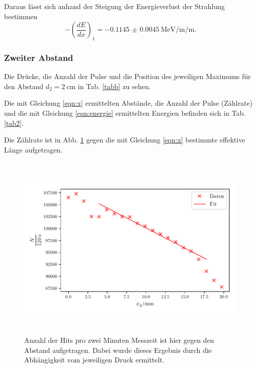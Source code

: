 \noindent Daraus lässt sich anhand der Steigung der Energieverlust der Strahlung bestimmen %
\begin{equation*}
    - \left( \frac{dE}{dx} \right)_1 = - \SI{0.1145(45)}{\mega\electronvolt\per\milli\per\meter}.
\end{equation*}

\subsubsection{Zweiter Abstand}
Die Drücke, die Anzahl der Pulse und die Position des jeweiligen Maximums für den Abstand $d_2 = \SI{2}{\centi\meter}$ in Tab. \ref{tabb} zu sehen.
 
 

\noindent Die mit Gleichung \eqref{eqn:x} ermittelten Abstände, die Anzahl der Pulse (Zählrate) und die mit Gleichung \eqref{eqn:energie} ermittelten Energien befinden sich in Tab. \ref{tab2}. 

 

\noindent Die Zählrate ist in Abb. \ref{zaehlrate2} gegen die mit Gleichung \eqref{eqn:x} bestimmte effektive Länge aufgetragen.

\begin{figure}
    \centering
    \includegraphics[width=15cm, height=9cm]{build/plotc.pdf}
    \caption{Anzahl der Hits pro zwei Minuten Messzeit ist hier gegen den Abstand aufgetragen. Dabei wurde dieses Ergebnis durch die Abhängigkeit vom jeweiligen Druck ermittelt.}
    \label{zaehlrate2}
\end{figure}

